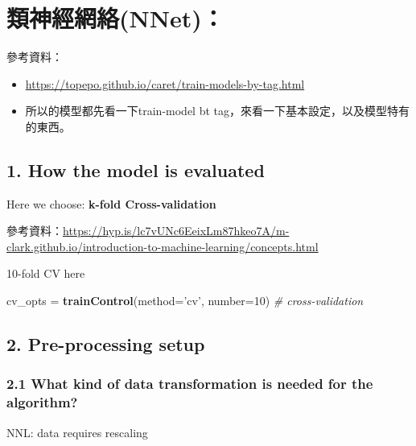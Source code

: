 \documentclass[]{book}
\newenvironment{Shaded}{\begin{snugshade}}{\end{snugshade}}
\newcommand{\KeywordTok}[1]{\textcolor[rgb]{0.13,0.29,0.53}{\textbf{#1}}}
\newcommand{\DataTypeTok}[1]{\textcolor[rgb]{0.13,0.29,0.53}{#1}}
\newcommand{\DecValTok}[1]{\textcolor[rgb]{0.00,0.00,0.81}{#1}}
\newcommand{\StringTok}[1]{\textcolor[rgb]{0.31,0.60,0.02}{#1}}
\newcommand{\CommentTok}[1]{\textcolor[rgb]{0.56,0.35,0.01}{\textit{#1}}}
\newcommand{\NormalTok}[1]{#1}
\begin{document}
\hypertarget{nnet}{%
\section{類神經網絡(NNet)：}\label{nnet}}

參考資料：

\begin{itemize}
\item
  \url{https://topepo.github.io/caret/train-models-by-tag.html}
\item
  所以的模型都先看一下train-model bt tag，來看一下基本設定，以及模型特有的東西。
\end{itemize}

\hypertarget{how-the-model-is-evaluated}{%
\subsection{1. How the model is evaluated}\label{how-the-model-is-evaluated}}

Here we choose: \textbf{k-fold Cross-validation}

參考資料：\url{https://hyp.is/lc7vUNc6EeixLm87hkeo7A/m-clark.github.io/introduction-to-machine-learning/concepts.html}

10-fold CV here

\begin{Shaded}
\begin{Highlighting}[]
\NormalTok{cv_opts =}\StringTok{ }\KeywordTok{trainControl}\NormalTok{(}\DataTypeTok{method=}\StringTok{'cv'}\NormalTok{, }\DataTypeTok{number=}\DecValTok{10}\NormalTok{) }\CommentTok{# cross-validation }
\end{Highlighting}
\end{Shaded}

\hypertarget{pre-processing-setup}{%
\subsection{2. Pre-processing setup}\label{pre-processing-setup}}

\hypertarget{what-kind-of-data-transformation-is-needed-for-the-algorithm}{%
\subsubsection{2.1 What kind of data transformation is needed for the algorithm?}\label{what-kind-of-data-transformation-is-needed-for-the-algorithm}}

NNL: data requires rescaling
\end{document}
